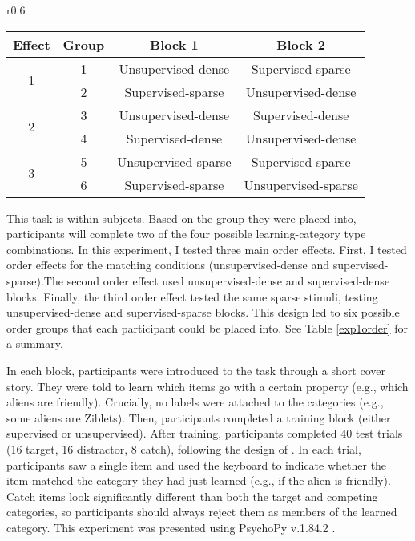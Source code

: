 \documentclass[../dissertation.tex]{subfiles}
\begin{document}
\begin{wraptable}[11]{r}{0.6\linewidth}
\caption{Block orders for statistical density task}
\vspace{-10pt}
\begin{center}
\begin{tabular}{ c|c|c|c } 
 \hline 
 Effect & Group & Block 1 & Block 2 \\ 
 \hline
 \multirow{2}{*}{1} & 1 & Unsupervised-dense & Supervised-sparse \\ 
 & 2 & Supervised-sparse & Unsupervised-dense \\ 
 \hline
  \multirow{2}{*}{2} & 3 & Unsupervised-dense & Supervised-dense \\ 
 & 4 & Supervised-dense & Unsupervised-dense \\
 \hline 
  \multirow{2}{*}{3} & 5 & Unsupervised-sparse & Supervised-sparse \\ 
 & 6 & Supervised-sparse & Unsupervised-sparse \\ 
 \hline
\end{tabular}
\end{center}
\label{exp1order}
\end{wraptable} 
	This task is within-subjects. Based on the group they were placed into, participants will complete two of the four possible learning-category type combinations. In this experiment, I tested three main order effects. First, I tested order effects for the matching conditions (unsupervised-dense and supervised-sparse).The second order effect used unsupervised-dense and supervised-dense blocks. Finally, the third order effect tested the same sparse stimuli, testing unsupervised-dense and supervised-sparse blocks. This design led to six possible order groups that each participant could be placed into. See Table \ref{exp1order} for a summary. \par
 In each block, participants were introduced to the task through a short cover story. They were told to learn which items go with a certain property (e.g., which aliens are friendly). Crucially, no labels were attached to the categories (e.g., some aliens are Ziblets). Then, participants completed a training block (either supervised or unsupervised). After training, participants completed 40 test trials (16 target, 16 distractor, 8 catch), following the design of \citet{Kloos2008} . In each trial, participants saw a single item and used the keyboard to indicate whether the item matched the category they had just learned (e.g., if the alien is friendly). Catch items look significantly different than both the target and competing categories, so participants should always reject them as members of the learned category. This experiment was presented using PsychoPy v.1.84.2 \citep{Peirce2007}. \par
\end{document}
